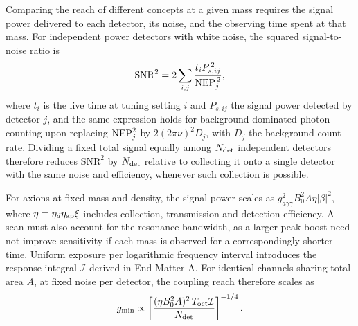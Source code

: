 \documentclass[
  aps,prl,reprint,superscriptaddress,
  amsmath,amssymb,floatfix,nofootinbib
]{revtex4-2}
\newcommand{\gagg}{g_{a\gamma\gamma}}
\begin{document}
Comparing the reach of different concepts at a given mass requires the signal power delivered to each detector, its noise, and the observing time spent at that mass. For independent power detectors with white noise, the squared signal-to-noise ratio is
\begin{equation}
\mathrm{SNR}^2=2\sum_{i,j}
\frac{t_i P_{s,ij}^{\,2}}{{\rm NEP}_j^{\,2}},
\label{eq:comparison_snr}
\end{equation}
where $t_i$ is the live time at tuning setting $i$ and $P_{s,ij}$ the signal power detected by detector $j$, and the same expression holds for background-dominated photon counting upon replacing ${\rm NEP}_j^2$ by $2(2\pi\nu)^2D_j$, with $D_j$ the background count rate. Dividing a fixed total signal equally among $N_{\rm det}$ independent detectors therefore reduces $\mathrm{SNR}^2$ by $N_{\rm det}$ relative to collecting it onto a single detector with the same noise and efficiency, whenever such collection is possible.


For axions at fixed mass and density, the signal power scales as $\gagg^2 B_0^2 A\eta|\beta|^2$, where $\eta=\eta_d\eta_{\rm ap}\xi$ includes collection, transmission and detection efficiency. A scan must also account for the resonance bandwidth, as a larger peak boost need not improve sensitivity if each mass is observed for a correspondingly shorter time. Uniform exposure per logarithmic frequency interval introduces the response integral $\mathcal I$ derived in End Matter A. For identical channels sharing total area $A$, at fixed noise per detector, the coupling reach therefore scales as
\begin{equation}
g_{\min}\propto
\left[
\frac{(\eta B_0^2A)^2\,T_{\rm oct}\mathcal I}
{N_{\rm det}}
\right]^{-1/4}.
\end{equation}
\end{document}
